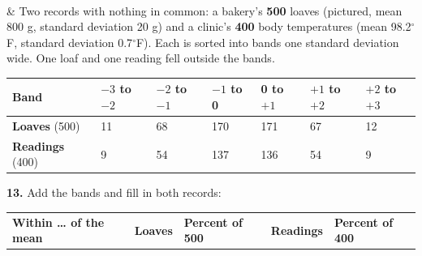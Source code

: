 \documentclass[12pt]{article}
\begin{document}
\begin{guidednotes}
\begin{minipage}[c]{0.52\linewidth}
\end{minipage}
\\
& Two records with nothing in common: a bakery's \textbf{500} loaves (pictured, mean 800 g,
standard deviation 20 g) and a clinic's \textbf{400} body temperatures (mean 98.2$^\circ$F,
standard deviation 0.7$^\circ$F). Each is sorted into bands one standard deviation wide. One loaf
and one reading fell outside the bands.
\par\vspace{3pt}
\footnotesize\setlength{\tabcolsep}{2pt}%
\renewcommand{\arraystretch}{1.15}
\begin{tabularx}{\linewidth}{@{} l Y Y Y Y Y Y @{}}
\textbf{Band} & $-3$ to $-2$ & $-2$ to $-1$ & $-1$ to 0 & 0 to $+1$ & $+1$ to $+2$ &
  $+2$ to $+3$ \\
\hline
\textbf{Loaves} (500) & 11 & 68 & 170 & 171 & 67 & 12 \\
\textbf{Readings} (400) & 9 & 54 & 137 & 136 & 54 & 9 \\
\end{tabularx}
\par\vspace{4pt}
\normalsize\textbf{13.} Add the bands and fill in both records:\par
\vspace{2pt}
\footnotesize\setlength{\tabcolsep}{2pt}%
\renewcommand{\arraystretch}{1.3}
\begin{tabularx}{\linewidth}{@{} l Y Y Y Y @{}}
\textbf{Within \ldots{} of the mean} & \textbf{Loaves} & \textbf{Percent of 500} &
\textbf{Readings} & \textbf{Percent of 400} \\

\end{tabularx}
\end{guidednotes}
\end{document}
